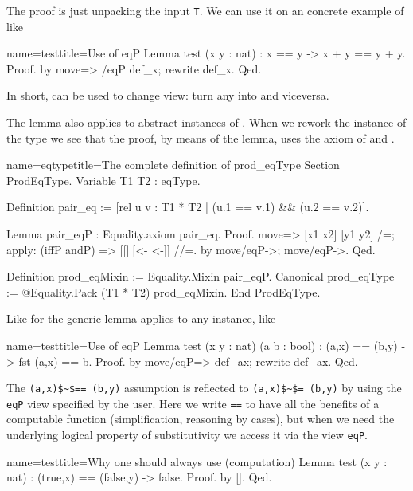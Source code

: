 The proof is just unpacking the input \lstinline/T/.
We can use it on an concrete example of  like 

\begin{coq}{name=test}{title=Use of eqP}
Lemma test (x y : nat) : x == y -> x + y == y + y.
Proof. by move=> /eqP def_x; rewrite def_x. Qed.
\end{coq}

In short,  can be used to change view: turn any
\C{==} into \C{=} and viceversa.

The  lemma also applies to abstract instances of .
When we rework the instance of the type  we see that the
proof, by means of the  lemma, uses the axiom of  and
.

\begin{coq}{name=eqtype}{title=The complete definition of prod\_eqType}
Section ProdEqType.
Variable T1 T2 : eqType.

Definition pair_eq := [rel u v : T1 * T2 | (u.1 == v.1) && (u.2 == v.2)].

Lemma pair_eqP : Equality.axiom pair_eq.
Proof.
move=> [x1 x2] [y1 y2] /=; apply: (iffP andP) => [[]|[<- <-]] //=.
by move/eqP->; move/eqP->.
Qed.

Definition prod_eqMixin := Equality.Mixin pair_eqP.
Canonical prod_eqType := @Equality.Pack (T1 * T2) prod_eqMixin.
End ProdEqType.
\end{coq}

Like for  the generic lemma  applies to
any  instance, like 

\begin{coq}{name=test}{title=Use of eqP}
Lemma test (x y : nat) (a b : bool) : (a,x) == (b,y) -> fst (a,x) == b.
Proof. by move/eqP=> def_ax; rewrite def_ax. Qed.
\end{coq}

The \lstinline/(a,x)$~$== (b,y)/ assumption is reflected to
\lstinline/(a,x)$~$= (b,y)/ by using the \lstinline/eqP/ view
specified by the user.  Here we write \lstinline/==/ to have
all the benefits of a computable function (simplification, reasoning
by cases), but when we need the underlying logical property of
substitutivity we access it via the view \lstinline/eqP/.

\begin{coq}{name=test}{title=Why one should always use \C{==}
	(computation)}
Lemma test (x y : nat) : (true,x) == (false,y) -> false.
Proof. by []. Qed.
\end{coq}

